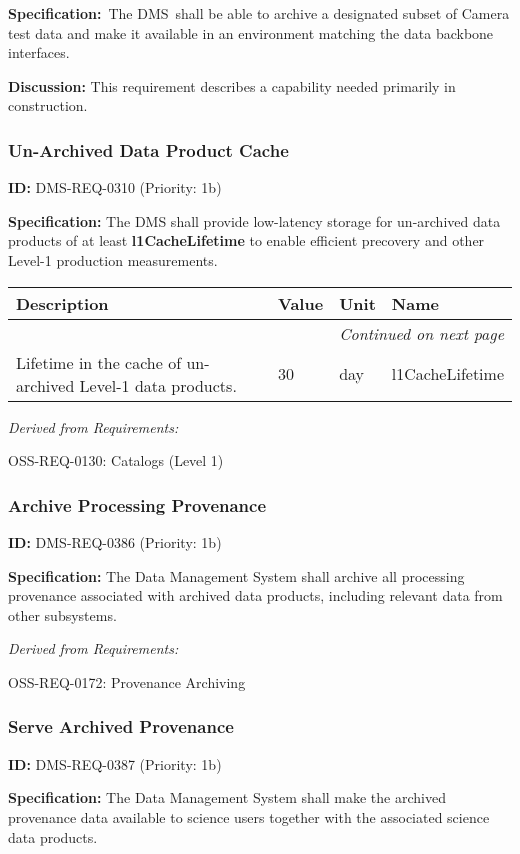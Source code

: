 \documentclass[SE,toc,lsstdraft]{lsstdoc}
\makeatletter
\newcommand{\paramname}[1]{\hspace{0pt}#1}
\newcommand{\unitname}[1]{\hspace{0pt}#1}
\newenvironment{parameters}[0]{%
\setlength\LTleft{0pt}
\setlength\LTright{\fill}
\begin{small}
\begin{longtable}[]{|p{0.49\textwidth}|l|p{0.6in}|p{1.70in}@{}|}

\hline \textbf{Description} & \textbf{Value} & \textbf{Unit} & \textbf{Name} \\ \hline
\endhead

\hline \multicolumn{4}{r}{\emph{Continued on next page}} \\
\endfoot

\hline\hline
\endlastfoot
}{%
\hline
\end{longtable}
\end{small}
}
\makeatother
\begin{document}
\textbf{Specification:} The DMS shall be able to archive a designated subset of Camera test data and make it available in an environment matching the data backbone interfaces.

\textbf{Discussion:}
This requirement describes a capability needed primarily in construction.

\subsubsection{Un-Archived Data Product Cache}

\label{DMS-REQ-0310}
\textbf{ID:} DMS-REQ-0310 (Priority: 1b)

\textbf{Specification:} The DMS shall provide low-latency storage for un-archived data products of at least \textbf{l1CacheLifetime }to enable efficient precovery and other Level-1 production measurements.

\begin{parameters}
Lifetime in the cache of un-archived Level-1 data products.
&
30
&
\unitname{%
day
}
&
\paramname{%
l1CacheLifetime
} \\\hline
\end{parameters}

\emph{Derived from Requirements:}

OSS-REQ-0130:
Catalogs (Level 1) \newline

\subsubsection{Archive Processing Provenance}

\label{DMS-REQ-0386}
\textbf{ID:} DMS-REQ-0386 (Priority: 1b)

\textbf{Specification:}
The Data Management System shall archive all processing provenance associated with archived data products, including relevant data from other subsystems.

\emph{Derived from Requirements:}

OSS-REQ-0172:
Provenance Archiving \newline

\subsubsection{Serve Archived Provenance}

\label{DMS-REQ-0387}
\textbf{ID:} DMS-REQ-0387 (Priority: 1b)

\textbf{Specification:}
The Data Management System shall make the archived provenance data available to science users together with the associated science data products.
\end{document}

